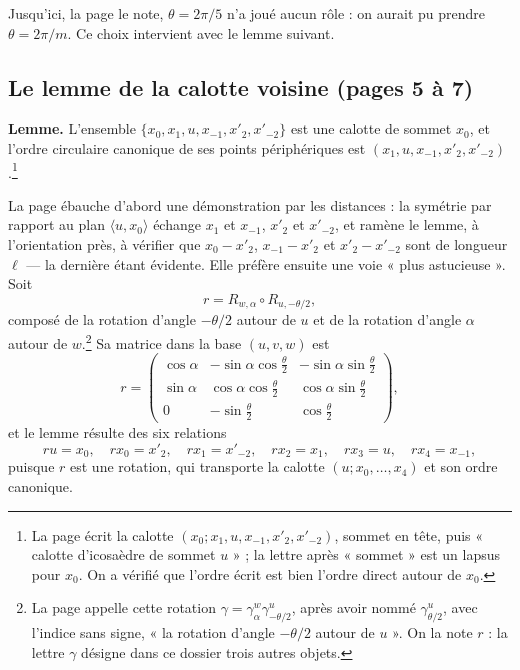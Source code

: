 \documentclass[11pt,a4paper]{article}
\begin{document}
Jusqu'ici, la page le note, $\theta = 2\pi/5$ n'a joué aucun rôle : on aurait
pu prendre $\theta = 2\pi/m$. Ce choix intervient avec le lemme suivant.

\subsection*{Le lemme de la calotte voisine (pages 5 à 7)}

\textbf{Lemme.} L'ensemble $\{x_0, x_1, u, x_{-1}, x'_2, x'_{-2}\}$ est une
calotte de sommet $x_0$, et l'ordre circulaire canonique de ses points
périphériques est $(x_1, u, x_{-1}, x'_2, x'_{-2})$.\footnote{La page écrit la
calotte $(x_0; x_1, u, x_{-1}, x'_2, x'_{-2})$, sommet en tête, puis « calotte
d'icosaèdre de sommet $u$ » ; la lettre après « sommet » est un lapsus pour
$x_0$. On a vérifié que l'ordre écrit est bien l'ordre direct autour de
$x_0$.}

La page ébauche d'abord une démonstration par les distances : la symétrie par
rapport au plan $\langle u, x_0 \rangle$ échange $x_1$ et $x_{-1}$, $x'_2$ et
$x'_{-2}$, et ramène le lemme, à l'orientation près, à vérifier que
$x_0 - x'_2$, $x_{-1} - x'_2$ et $x'_2 - x'_{-2}$ sont de longueur $\ell$ ---
la dernière étant évidente. Elle préfère ensuite une voie « plus astucieuse ».
Soit
\[
r = R_{w,\alpha} \circ R_{u,-\theta/2},
\]
composé de la rotation d'angle $-\theta/2$ autour de $u$ et de la rotation
d'angle $\alpha$ autour de $w$.\footnote{La page appelle cette rotation
$\gamma = \gamma^{w}_{\alpha}\gamma^{u}_{-\theta/2}$, après avoir nommé
$\gamma^{u}_{\theta/2}$, avec l'indice sans signe, « la rotation d'angle
$-\theta/2$ autour de $u$ ». On la note $r$ : la lettre $\gamma$ désigne dans
ce dossier trois autres objets.} Sa matrice dans la base $(u, v, w)$ est
\[
r = \begin{pmatrix}
\cos\alpha & -\sin\alpha\cos\frac{\theta}{2} & -\sin\alpha\sin\frac{\theta}{2} \\
\sin\alpha & \cos\alpha\cos\frac{\theta}{2} & \cos\alpha\sin\frac{\theta}{2} \\
0 & -\sin\frac{\theta}{2} & \cos\frac{\theta}{2}
\end{pmatrix},
\]
et le lemme résulte des six relations
\[
r u = x_0,\quad r x_0 = x'_2,\quad r x_1 = x'_{-2},\quad r x_2 = x_1,\quad r x_3 = u,\quad r x_4 = x_{-1},
\]
puisque $r$ est une rotation, qui transporte la calotte $(u; x_0, \ldots, x_4)$
et son ordre canonique.
\end{document}
